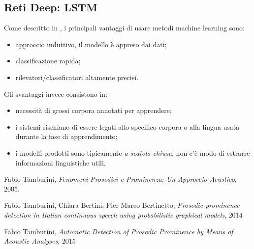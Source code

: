 \documentclass[twoside,twocolumn]{article}
\theoremstyle{definition}
\begin{document}
	\subsection{Reti Deep: LSTM}
		Come descritto in \cite{bib:prominence-by-acoustic-analyses}, i principali vantaggi di usare metodi machine learning sono:
		\begin{itemize}
			\item approccio induttivo, il modello è appreso dai dati;
			\item classificazione rapida;
			\item rilevatori/classificatori altamente precisi.
		\end{itemize}
		Gli svantaggi invece consistono in:
		\begin{itemize}
			\item necessità di grossi corpora annotati per apprendere;
			\item i sistemi rischiano di essere legati allo specifico corpora o alla lingua usata durante la fase di apprendimento;
			\item i modelli prodotti sono tipicamente \textit{a scatola chiusa}, non c'è modo di estrarre informazioni linguistiche utili.
		\end{itemize}
		
\begin{thebibliography}{99}	
		Fabio Tamburini,
		\newblock \emph{Fenomeni Prosodici e Prominenza: Un Approccio Acustico},
		2005.
	
		Fabio Tamburini, Chiara Bertini, Pier Marco Bertinetto,
		\newblock \emph{Prosodic prominence detection in Italian continuous speech using probabilistic graphical models},
		2014
		
		Fabio Tamburini,
		\newblock \emph{Automatic Detection of Prosodic Prominence by Means of Acoustic Analyses},
		2015
\end{thebibliography}
\end{document}
